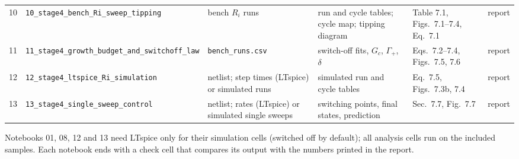 \documentclass[11pt]{article}
\newcommand{\nbf}[1]{\nolinkurl{#1}}
\begin{document}
\begin{tabularx}{\linewidth}{@{}c>{\raggedright\arraybackslash}p{5.2cm}>{\raggedright\arraybackslash}X>{\raggedright\arraybackslash}X>{\raggedright\arraybackslash}p{4.3cm}c@{}}
10 & \nbf{10_stage4_bench_Ri_sweep_tipping} & bench $R_i$ runs & run and cycle tables; cycle map; tipping diagram & Table 7.1, Figs.\ 7.1--7.4, Eq.\ 7.1 & report \\
11 & \nbf{11_stage4_growth_budget_and_switchoff_law} & \texttt{bench\_runs.csv} & switch-off fits, $G_c$, $\Gamma_+$, $\delta$ & Eqs.\ 7.2--7.4, Figs.\ 7.5, 7.6 & report \\
12 & \nbf{12_stage4_ltspice_Ri_simulation} & netlist; step times (LTspice) or simulated runs & simulated run and cycle tables & Eq.\ 7.5, Figs.\ 7.3b, 7.4 & report \\
13 & \nbf{13_stage4_single_sweep_control} & netlist; rates (LTspice) or simulated single sweeps & switching points, final states, prediction & Sec.\ 7.7, Fig.\ 7.7 & report \\
\bottomrule
\end{tabularx}

\normalsize
\medskip
\noindent Notebooks 01, 08, 12 and 13 need LTspice only for their simulation cells (switched off by default); all analysis cells run on
the included samples. Each notebook ends with a check cell that compares its output with the numbers printed in the report.
\end{document}
